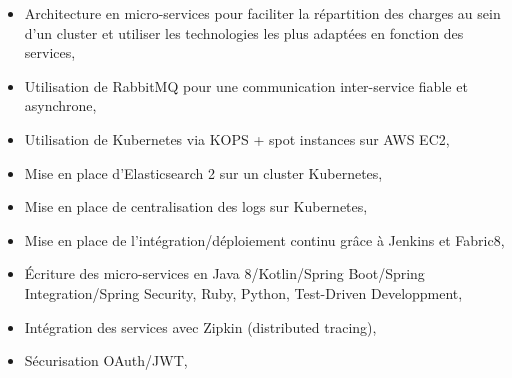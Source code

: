 \documentclass[11pt,a4paper]{moderncv}
\begin{document}
{\begin{itemize}
{        \begin{itemize}
        \item Architecture en micro-services pour faciliter la répartition des charges au sein d'un cluster et utiliser les technologies les plus adaptées en fonction des services,
        \item Utilisation de RabbitMQ pour une communication inter-service fiable et asynchrone,
        \item Utilisation de Kubernetes via KOPS + spot instances sur AWS EC2,
        \item Mise en place d'Elasticsearch 2 sur un cluster Kubernetes,
        \item Mise en place de centralisation des logs sur Kubernetes,
        \item Mise en place de l'intégration/déploiement continu grâce à Jenkins et Fabric8,
        \item Écriture des micro-services en Java 8/Kotlin/Spring Boot/Spring Integration/Spring Security, Ruby, Python, Test-Driven Developpment,
        \item Intégration des services avec Zipkin (distributed tracing),
        \item Sécurisation OAuth/JWT,
        \end{itemize}
      }
\end{itemize}
}
\end{document}
